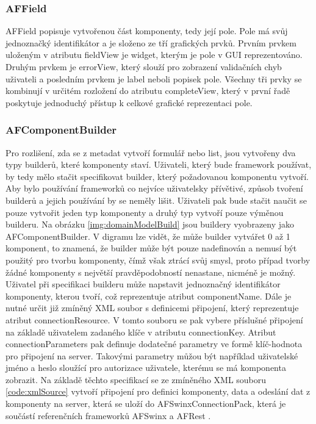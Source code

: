 \subsubsection{AFField}
AFField popisuje vytvořenou část komponenty, tedy její pole. Pole má svůj jednoznačký identifikátor a je složeno ze tří grafických prvků. Prvním prvkem uloženým v atributu fieldView je widget, kterým je pole v GUI reprezentováno. Druhým prvkem je errorView, který slouží pro zobrazení validačních chyb uživateli a posledním prvkem je label neboli popisek pole. Všechny tři prvky se kombinují v určitém rozložení do atributu completeView, který v první řadě poskytuje jednoduchý přístup k celkové grafické reprezentaci pole.

\subsubsection{AFComponentBuilder}
Pro rozlišení, zda se z metadat vytvoří formulář nebo list, jsou vytvořeny dva typy builderů, které komponenty staví. Uživateli, který bude framework používat, by tedy mělo stačit specifikovat builder, který požadovanou komponentu vytvoří. Aby bylo používání frameworků co nejvíce uživatelsky přívětivé, způsob tvoření builderů a jejich používání by se neměly lišit. Uživateli pak bude stačit naučit se pouze vytvořit jeden typ komponenty a druhý typ vytvoří pouze výměnou builderu. Na obrázku \ref{img:domainModelBuild} jsou buildery vyobrazeny jako AFComponentBuilder. V digramu lze vidět, že může builder vytvářet 0 až 1 komponent, to znamená, že builder může být pouze nadefinován a nemusí být použitý pro tvorbu komponenty, čímž však ztrácí svůj smysl, proto případ tvorby žádné komponenty s největší pravděpodobností nenastane, nicméně je možný. Uživatel při specifikaci builderu může napstavit jednoznačný identifikátor komponenty, kterou tvoří, což reprezentuje atribut componentName. Dále je nutné určit již zmíněný XML soubor s definicemi připojení, který reprezentuje atribut connectionResource. V tomto souboru se pak vybere příslušné připojení na základě uživatelem zadaného klíče v atributu connectionKey. Atribut connectionParameters pak definuje dodatečné parametry ve formě klíč-hodnota pro připojení na server. Takovými parametry můžou být například uživatelské jméno a heslo sloužící pro autorizace uživatele, kterému se má komponenta zobrazit. Na základě těchto specifikací se ze zmíněného XML souboru \ref{code:xmlSource} vytvoří připojení pro definici komponenty, data a odeslání dat z komponenty na server, která se uloží do AFSwinxConnectionPack, která je součástí referenčních frameworků AFSwinx a AFRest \cite{tomasek-thesis}.

